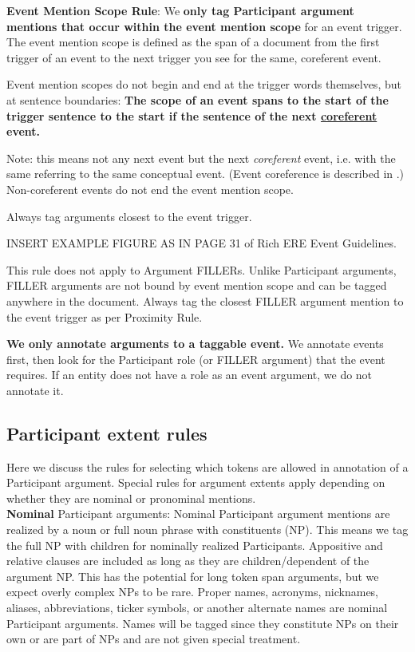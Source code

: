 \noindent\textbf{Event Mention Scope Rule}:
We \textbf{only tag Participant argument mentions that occur within the event mention scope} for an event trigger.
The event mention scope is defined as the span of a document from the first trigger of an event to the next trigger you see for the same, coreferent event.

Event mention scopes do not begin and end at the trigger words themselves, but at sentence boundaries:
\textbf{The scope of an event spans to the start of the trigger sentence to the start if the sentence of the next \uline{coreferent} event.}

Note: this means not any next event but the next \emph{coreferent} event, i.e. with the same  referring to the same conceptual event.
(Event coreference is described in .)
Non-coreferent events do not end the event mention scope.

Always tag arguments closest to the event trigger.

INSERT EXAMPLE FIGURE AS IN PAGE 31 of Rich ERE Event Guidelines.

This rule does not apply to Argument FILLERs.
Unlike Participant arguments, FILLER arguments are not bound by event mention scope and can be tagged anywhere in the document.
Always tag the closest FILLER argument mention to the event trigger as per Proximity Rule.

\noindent\textbf{We only annotate arguments to a taggable event.}
We annotate events first, then look for the Participant role (or FILLER argument) that the event requires. 
If an entity does not have a role as an event argument, we do not annotate it.\\

\subsection{Participant extent rules}
Here we discuss the rules for selecting which tokens are allowed in annotation of a Participant argument.
Special rules for argument extents apply depending on whether they are nominal or pronominal mentions.\\

\noindent\textbf{Nominal} Participant arguments:
Nominal Participant argument mentions are realized by a noun or full noun phrase with constituents (NP).
This means we tag the full NP with children for nominally realized Participants.
Appositive and relative clauses are included as long as they are children/dependent of the argument NP.
This has the potential for long token span arguments, but we expect overly complex NPs to be rare.
Proper names, acronyms, nicknames, aliases, abbreviations, ticker symbols, or another alternate names are nominal Participant arguments.
Names will be tagged since they constitute NPs on their own or are part of NPs and are not given special treatment.

